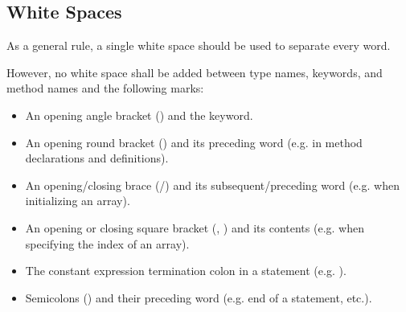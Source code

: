 \subsection{White Spaces}%
\label{subsec:WhiteSpaces}

As a general rule, a single white space should be used to separate every word.

However, no white space shall be added between type names, keywords, and method
names and the following marks:
\begin{itemize}
\item An opening angle bracket (\code{<}) and the  keyword.
\item An opening round bracket (\code{(}) and its preceding word (e.g. in method
declarations and definitions).
\item An opening/closing brace (\code{\{}/\code{\}}) and its
subsequent/preceding word (e.g. when initializing an array).
\item An opening or closing square bracket (\code{[}, \code{]} ) and its
contents (e.g. when specifying the index of an array).
\item The constant expression termination colon in a  statement
(e.g. ).
\item Semicolons (\code{;}) and their preceding word (e.g. end of a statement,
etc.).
\end{itemize}

